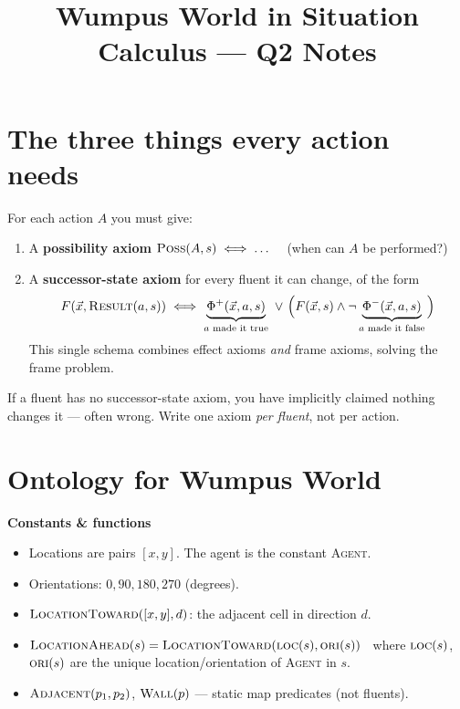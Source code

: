 \documentclass[11pt,a4paper]{article}
\title{\vspace{-1.5cm}Wumpus World in Situation Calculus --- Q2 Notes}
\author{}
\date{}
\newcommand{\pred}[1]{\textsc{#1}}
\newcommand{\Result}{\pred{Result}}
\newcommand{\Poss}{\pred{Poss}}
\begin{document}
\maketitle
\vspace{-1cm}

\section*{The three things every action needs}

For each action $A$ you must give:

\begin{enumerate}[leftmargin=*,itemsep=2pt]
  \item A \textbf{possibility axiom} $\Poss(A, s) \iff \ldots$ \ \ (when can $A$ be performed?)
  \item A \textbf{successor-state axiom} for every fluent it can change, of the form
  \[
    F(\vec{x}, \Result(a, s)) \iff \underbrace{\Phi^+(\vec{x}, a, s)}_{\text{$a$ made it true}} \ \vee\ \Big( F(\vec{x}, s) \wedge \neg\underbrace{\Phi^-(\vec{x}, a, s)}_{\text{$a$ made it false}}\Big)
  \]
  This single schema combines effect axioms \emph{and} frame axioms, solving the frame problem.
\end{enumerate}

If a fluent has no successor-state axiom, you have implicitly claimed nothing changes it --- often wrong. Write one axiom \emph{per fluent}, not per action.

\section*{Ontology for Wumpus World}

\textbf{Constants \& functions}
\begin{itemize}[leftmargin=*,itemsep=1pt]
  \item Locations are pairs $[x,y]$. The agent is the constant \pred{Agent}.
  \item Orientations: $0, 90, 180, 270$ (degrees).
  \item $\pred{LocationToward}([x,y], d)$: the adjacent cell in direction $d$.
  \item $\pred{LocationAhead}(s) = \pred{LocationToward}(\pred{loc}(s), \pred{ori}(s))$ \ where $\pred{loc}(s)$, $\pred{ori}(s)$ are the unique location/orientation of \pred{Agent} in $s$.
  \item $\pred{Adjacent}(p_1, p_2)$, $\pred{Wall}(p)$ --- static map predicates (not fluents).
\end{itemize}
\end{document}

